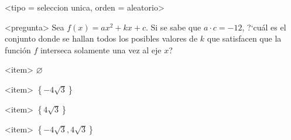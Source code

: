 <tipo = seleccion unica, orden = aleatorio>

<pregunta>
Sea $f(x)=ax^2+kx+c$. Si se sabe que $a\cdot c=-12$, ?`cu\'al es el conjunto donde se hallan todos los posibles valores de $k$ que satisfacen que la funci\'on $f$ interseca solamente una vez al eje $x$?


<item>
$\varnothing$

<item>
$\left\{-4\sqrt{3}\right\}$

<item>
$\left\{4\sqrt{3}\right\}$

<item>
$\left\{-4\sqrt{3},4\sqrt{3}\right\}$



